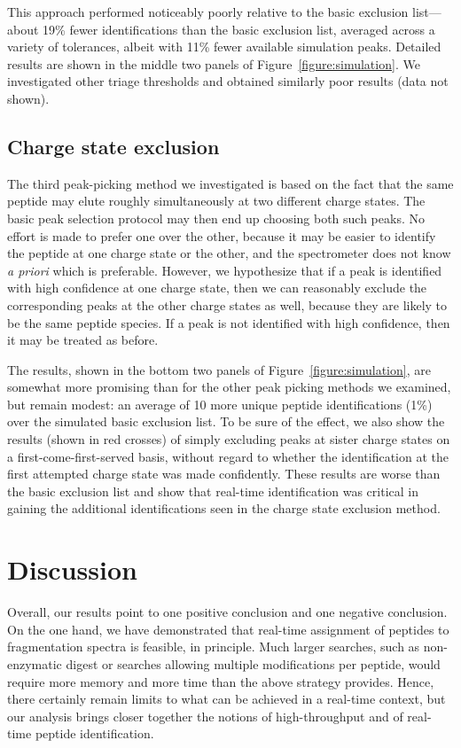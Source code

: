 \documentclass[12pt]{article}
\begin{document}
This approach performed noticeably poorly relative to the basic exclusion list---about 19\% fewer identifications than the basic exclusion list, averaged
across a variety of tolerances, albeit with 11\% fewer available simulation
peaks. Detailed results are shown in the middle two panels of Figure~\ref{figure:simulation}. We investigated other triage thresholds and obtained similarly poor results (data not shown).

\subsection*{Charge state exclusion}

The third peak-picking method we investigated is based on the fact that the same
peptide may elute roughly simultaneously at two different charge states. The
basic peak selection protocol may then end up choosing both such peaks. No
effort is made to prefer one over the other, because it may be easier to
identify the peptide at one charge state or the other, and the spectrometer does
not know {\it a priori} which is preferable. However, we hypothesize that if a peak is identified with high confidence at
one charge state, then we can reasonably exclude the corresponding peaks at the
other charge states as well, because they are likely to be the same peptide
species. If a peak is not identified with high confidence, then it may be
treated as before.

The results, shown in the bottom two panels of Figure~\ref{figure:simulation}, are somewhat more
promising than for the other peak picking methods we examined, but remain
modest: an average of 10 more unique peptide identifications (1\%) over the
simulated basic exclusion list. To be sure of the effect, we also show the
results (shown in red crosses) of simply excluding peaks at sister charge states
on a first-come-first-served basis, without regard to whether the identification
at the first attempted charge state was made confidently. These results are
worse than the basic exclusion list and show that real-time identification was
critical in gaining the additional identifications seen in the charge state
exclusion method.

\section*{Discussion}

Overall, our results point to one positive conclusion and one negative conclusion.  On the one hand, we have demonstrated that real-time assignment of peptides to fragmentation spectra is feasible, in principle.  
Much larger searches, such as non-enzymatic digest or searches
allowing multiple modifications per peptide, would require more memory
and more time than the above strategy provides. Hence, there certainly remain
limits to what can be achieved in a real-time context, but our analysis
brings closer together the notions of high-throughput and of real-time peptide identification.
\end{document}

